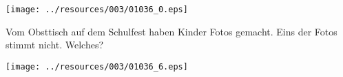\begin{center}
\texttt{[image: ../resources/003/01036\_0.eps]}
\end{center}

Vom Obsttisch auf dem Schulfest haben Kinder Fotos gemacht. Eins der Fotos stimmt nicht. Welches?\par

\begin{center}
\texttt{[image: ../resources/003/01036\_6.eps]}
\end{center}
